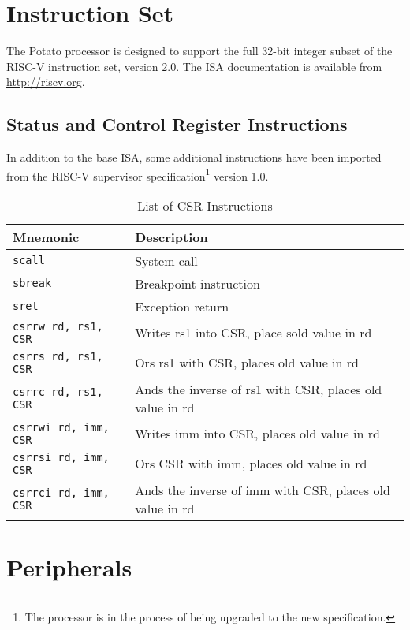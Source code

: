 \documentclass[12pt,a4paper]{report}
\begin{document}
\chapter{Instruction Set}

The Potato processor is designed to support the full 32-bit integer subset of
the RISC-V instruction set, version 2.0. The ISA documentation is available
from \url{http://riscv.org}.

\section{Status and Control Register Instructions}
\label{sec:csr_instrs}

In addition to the base ISA, some additional instructions have been imported
from the RISC-V supervisor specification\footnote{The processor is in
the process of being upgraded to the new specification.} version 1.0.

\begin{table}[htb]
	\centering
	\begin{tabular}{|l|l|}
		\hline
		\textbf{Mnemonic}		& \textbf{Description} \\
		\hline
		\texttt{scall}			& System call \\
		\texttt{sbreak}			& Breakpoint instruction \\
		\texttt{sret}			& Exception return \\
		\hline
		\texttt{csrrw rd, rs1, CSR}	& Writes rs1 into CSR, place sold value in rd \\
		\texttt{csrrs rd, rs1, CSR}	& Ors rs1 with CSR, places old value in rd \\
		\texttt{csrrc rd, rs1, CSR}	& Ands the inverse of rs1 with CSR, places old value in rd \\
		\texttt{csrrwi rd, imm, CSR}	& Writes imm into CSR, places old value in rd \\
		\texttt{csrrsi rd, imm, CSR}	& Ors CSR with imm, places old value in rd \\
		\texttt{csrrci rd, imm, CSR}	& Ands the inverse of imm with CSR, places old value in rd \\
		\hline
	\end{tabular}
	\caption{List of CSR Instructions}
\end{table}

\appendix

\chapter{Peripherals}
\end{document}
